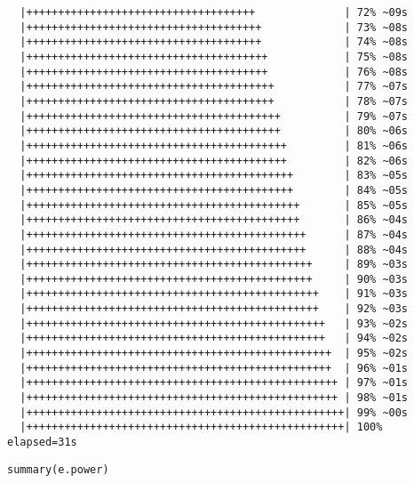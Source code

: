 \documentclass[12pt]{article}
\begin{document}
\begin{verbatim}
  |++++++++++++++++++++++++++++++++++++              | 72% ~09s          
  |+++++++++++++++++++++++++++++++++++++             | 73% ~08s          
  |+++++++++++++++++++++++++++++++++++++             | 74% ~08s          
  |++++++++++++++++++++++++++++++++++++++            | 75% ~08s          
  |++++++++++++++++++++++++++++++++++++++            | 76% ~08s          
  |+++++++++++++++++++++++++++++++++++++++           | 77% ~07s          
  |+++++++++++++++++++++++++++++++++++++++           | 78% ~07s          
  |++++++++++++++++++++++++++++++++++++++++          | 79% ~07s          
  |++++++++++++++++++++++++++++++++++++++++          | 80% ~06s          
  |+++++++++++++++++++++++++++++++++++++++++         | 81% ~06s          
  |+++++++++++++++++++++++++++++++++++++++++         | 82% ~06s          
  |++++++++++++++++++++++++++++++++++++++++++        | 83% ~05s          
  |++++++++++++++++++++++++++++++++++++++++++        | 84% ~05s          
  |+++++++++++++++++++++++++++++++++++++++++++       | 85% ~05s          
  |+++++++++++++++++++++++++++++++++++++++++++       | 86% ~04s          
  |++++++++++++++++++++++++++++++++++++++++++++      | 87% ~04s          
  |++++++++++++++++++++++++++++++++++++++++++++      | 88% ~04s          
  |+++++++++++++++++++++++++++++++++++++++++++++     | 89% ~03s          
  |+++++++++++++++++++++++++++++++++++++++++++++     | 90% ~03s          
  |++++++++++++++++++++++++++++++++++++++++++++++    | 91% ~03s          
  |++++++++++++++++++++++++++++++++++++++++++++++    | 92% ~03s          
  |+++++++++++++++++++++++++++++++++++++++++++++++   | 93% ~02s          
  |+++++++++++++++++++++++++++++++++++++++++++++++   | 94% ~02s          
  |++++++++++++++++++++++++++++++++++++++++++++++++  | 95% ~02s          
  |++++++++++++++++++++++++++++++++++++++++++++++++  | 96% ~01s          
  |+++++++++++++++++++++++++++++++++++++++++++++++++ | 97% ~01s          
  |+++++++++++++++++++++++++++++++++++++++++++++++++ | 98% ~01s          
  |++++++++++++++++++++++++++++++++++++++++++++++++++| 99% ~00s          
  |++++++++++++++++++++++++++++++++++++++++++++++++++| 100% elapsed=31s
\end{verbatim}


\lstset{language=r,label= ,caption= ,captionpos=b,numbers=none}
\begin{lstlisting}
summary(e.power)
\end{lstlisting}
\end{document}
